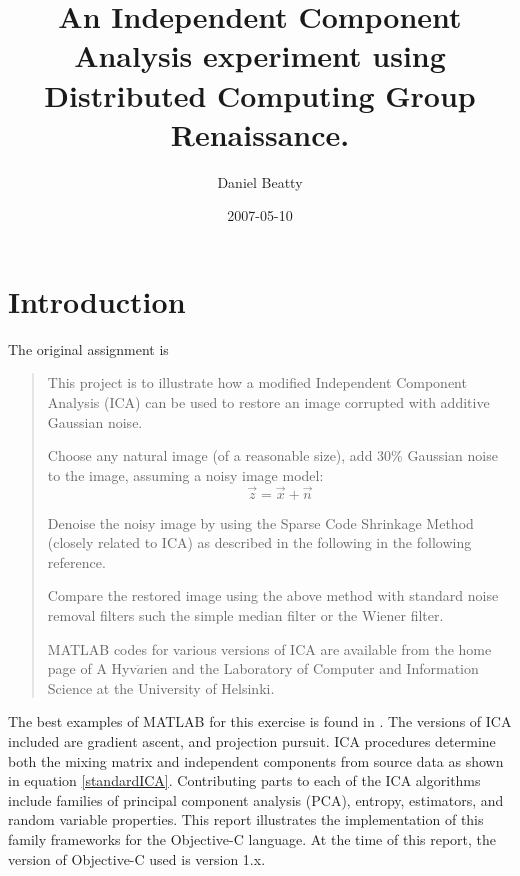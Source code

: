 \documentclass[12pt ]{article}
\title{An Independent Component Analysis experiment using Distributed Computing Group Renaissance.}
\author{ Daniel Beatty }
\date{2007-05-10}
\begin{document}
\maketitle


\begin{abstract}
\end{abstract}

\section{Introduction}
The original assignment is 
\begin{quote}
	This project is to illustrate how a modified Independent Component Analysis (ICA) can be used to restore an image corrupted with additive Gaussian noise.  

	Choose any natural image (of a reasonable size), add 30\% Gaussian noise to the image, assuming a noisy image model:
	\begin{equation}
	\vec{z} = \vec{x} + \vec{n}
	\end{equation}
	
	Denoise the noisy image by using the Sparse Code Shrinkage Method (closely related to ICA) as described in the following in the following reference. 
	
	Compare the restored image using the above method with standard noise removal filters such the simple median filter or the Wiener filter. 
	
	MATLAB codes for various versions of ICA are available from the home page of A Hyv$\ddot{a}$rien and the Laboratory of Computer and Information Science at the University of Helsinki. 
\end{quote}

The best examples of MATLAB for this exercise is found in \cite[159-162]{stone-ica-tutorial}.  The versions of ICA included are gradient ascent, and projection pursuit.  %
ICA procedures determine both the mixing matrix and independent components from source data as shown in equation \ref{standardICA}.  
Contributing parts to each of the ICA algorithms include families of principal component analysis (PCA), entropy, estimators, and random variable properties.  This report illustrates the implementation of this family %
frameworks for the Objective-C language.  At the time of this report, the version of Objective-C used is version 1.x.  %
\end{document}
